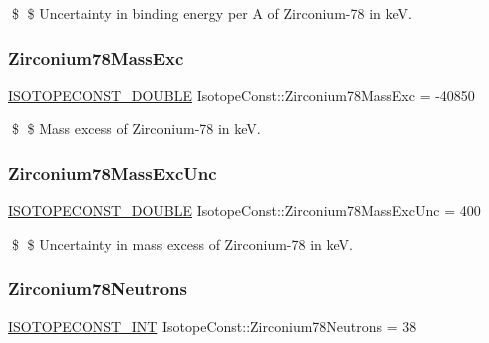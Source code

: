 \$ \$ Uncertainty in binding energy per A of Zirconium-\/78 in keV. \mbox{\label{group___isotope_const-_zirconium-_zr78_gac478dace1e64cf69471926db795f33c3}} 
\subsubsection{\texorpdfstring{Zirconium78\+Mass\+Exc}{Zirconium78MassExc}}
{\footnotesize\ttfamily \mbox{\hyperlink{group___isotope_const-_macros_ga8f45a7272ce02c0b4c65c44636ed719a}{I\+S\+O\+T\+O\+P\+E\+C\+O\+N\+S\+T\+\_\+\+D\+O\+U\+B\+LE}} Isotope\+Const\+::\+Zirconium78\+Mass\+Exc = -\/40850}

\$ \$ Mass excess of Zirconium-\/78 in keV. \mbox{\label{group___isotope_const-_zirconium-_zr78_gac327d20f48e733330db860091ce073ae}} 
\subsubsection{\texorpdfstring{Zirconium78\+Mass\+Exc\+Unc}{Zirconium78MassExcUnc}}
{\footnotesize\ttfamily \mbox{\hyperlink{group___isotope_const-_macros_ga8f45a7272ce02c0b4c65c44636ed719a}{I\+S\+O\+T\+O\+P\+E\+C\+O\+N\+S\+T\+\_\+\+D\+O\+U\+B\+LE}} Isotope\+Const\+::\+Zirconium78\+Mass\+Exc\+Unc = 400}

\$ \$ Uncertainty in mass excess of Zirconium-\/78 in keV. \mbox{\label{group___isotope_const-_zirconium-_zr78_gaed14ad932fd54f66b1da6baace36225b}} 
\subsubsection{\texorpdfstring{Zirconium78\+Neutrons}{Zirconium78Neutrons}}
{\footnotesize\ttfamily \mbox{\hyperlink{group___isotope_const-_macros_ga5f18360b3e99483a35c32d789e62621c}{I\+S\+O\+T\+O\+P\+E\+C\+O\+N\+S\+T\+\_\+\+I\+NT}} Isotope\+Const\+::\+Zirconium78\+Neutrons = 38}

